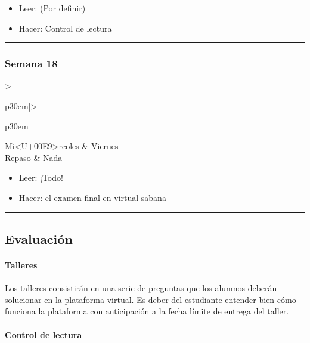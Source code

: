 \documentclass[spanish,]{article}
\let\oldparagraph\paragraph
\renewcommand{\paragraph}[1]{\oldparagraph{#1}\mbox{}}
\begin{document}
\begin{itemize}
\item
  Leer: (Por definir)
\item
  Hacer: Control de lectura
\end{itemize}

\begin{center}\rule{0.5\linewidth}{\linethickness}\end{center}

\subsubsection{Semana 18}\label{semana-18}

\begin{tabular}{>{\raggedright\arraybackslash}p{30em}|>{\raggedright\arraybackslash}p{30em}}
\hline
Mi<U+00E9>rcoles & Viernes\\
\hline
Repaso & Nada\\
\hline
\end{tabular}

\begin{itemize}
\item
  Leer: ¡Todo!
\item
  Hacer: el examen final en virtual sabana
\end{itemize}

\begin{center}\rule{0.5\linewidth}{\linethickness}\end{center}

\subsection{Evaluación}\label{evaluacion}

\paragraph{\texorpdfstring{\textbf{Talleres}}{Talleres}}\label{talleres}

Los talleres consistirán en una serie de preguntas que los alumnos
deberán solucionar en la plataforma virtual. Es deber del estudiante
entender bien cómo funciona la plataforma con anticipación a la fecha
límite de entrega del taller.

\paragraph{\texorpdfstring{\textbf{Control de
lectura}}{Control de lectura}}\label{control-de-lectura}
\end{document}
